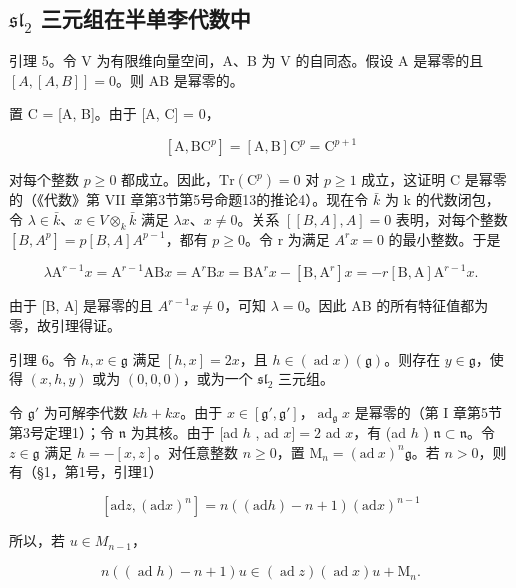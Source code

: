\subsection{\texorpdfstring{\(\mathfrak{sl}_2\) 三元组在半单李代数中}{\textbackslash mathfrak\{sl\}\_2 三元组在半单李代数中}}

引理 5。令 V 为有限维向量空间，A、B 为 V 的自同态。假设 A 是幂零的且 \([A, [A, B]] = 0\)。则 AB 是幂零的。

置 C = {[}A, B{]}。由于 {[}A, C{]} = 0，

\[
[ \mathrm{A}, \mathrm{BC} ^ {p} ] = [ \mathrm{A}, \mathrm{B} ] \mathrm{C} ^ {p} = \mathrm{C} ^ {p + 1}
\]

对每个整数 \(p \geq 0\) 都成立。因此，\(\mathrm{Tr}(\mathrm{C}^{p}) = 0\) 对 \(p \geq 1\) 成立，这证明 C 是幂零的（《代数》第 VII 章第3节第5号命题13的推论4）。现在令 \(\bar{k}\) 为 k 的代数闭包，令 \(\lambda \in \bar{k}\)、\(x \in V \otimes_{k} \bar{k}\) 满足 \(\lambda x\)、\(x \neq 0\)。关系 \([[B, A], A] = 0\) 表明，对每个整数 \([B, A^{p}] = p[B, A]A^{p-1}\)，都有 \(p \geq 0\)。令 r 为满足 \(A^{r}x = 0\) 的最小整数。于是

\[
\lambda \mathrm{A} ^ {r - 1} x = \mathrm{A} ^ {r - 1} \mathrm{AB} x = \mathrm{A} ^ {r} \mathrm{B} x = \mathrm{BA} ^ {r} x - [ \mathrm{B}, \mathrm{A} ^ {r} ] x = - r [ \mathrm{B}, \mathrm{A} ] \mathrm{A} ^ {r - 1} x.
\]

由于 {[}B, A{]} 是幂零的且 \(A^{r-1}x \neq 0\)，可知 \(\lambda = 0\)。因此 AB 的所有特征值都为零，故引理得证。

引理 6。令 \(h, x \in \mathfrak{g}\) 满足 \([h, x] = 2x\)，且 \(h \in (\operatorname{ad} x)(\mathfrak{g})\)。则存在 \(y \in \mathfrak{g}\)，使得 \((x, h, y)\) 或为 \((0, 0, 0)\)，或为一个 \(\mathfrak{sl}_2\) 三元组。

令 \(\mathfrak{g}'\) 为可解李代数 \(kh + kx\)。由于 \(x \in [\mathfrak{g}', \mathfrak{g}']\)，\(\operatorname{ad}_{\mathfrak{g}} x\) 是幂零的（第 I 章第5节第3号定理1）；令 \(\mathfrak{n}\) 为其核。由于 {[}ad \(h\) , ad \(x] = 2\) ad \(x\)，有 (ad \(h\) ) \(\mathfrak{n} \subset \mathfrak{n}\)。令 \(z \in \mathfrak{g}\) 满足 \(h = -[x, z]\)。对任意整数 \(n \geq 0\)，置 \(\mathrm{M}_n = (\mathrm{ad}~x)^n\mathfrak{g}\)。若 \(n > 0\)，则有（§1，第1号，引理1）

\[
[ \mathrm{ad} z, (\mathrm{ad} x) ^ {n} ] = n ((\mathrm{ad} h) - n + 1) (\mathrm{ad} x) ^ {n - 1}
\]

所以，若 \(u \in M_{n-1}\)，

\[
n ((\operatorname{ad} h) - n + 1) u \in (\operatorname{ad} z) (\operatorname{ad} x) u + \mathrm{M} _ {n}.
\]

